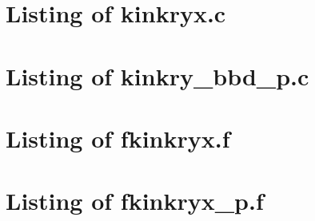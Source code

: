 
\newpage
\section{Listing of kinkryx.c}\label{s:kinkryx_c}

\newpage
\section{Listing of kinkry\_bbd\_p.c}\label{s:kinkry_bbd_p_c}


\newpage
\section{Listing of fkinkryx.f}\label{s:fkinkryx_f}

\newpage
\section{Listing of fkinkryx\_p.f}\label{s:fkinkryx_p_f}


